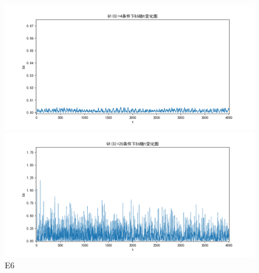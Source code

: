 \documentclass[10pt, a4paper]{article}
\begin{document}
    \begin{figure}[H]
        \begin{minipage}[t]{0.49\textwidth}
            \centering
            \includegraphics[width=\textwidth]{./q5_pics/cmp/E6.png}
        \end{minipage}
        \begin{minipage}[t]{0.49\textwidth}
            \centering
            \includegraphics[width=\textwidth]{./q5_pics/exp/E6.png}
        \end{minipage}
        \caption{E6}\label{fig:E6 in q5}
    \end{figure}
\end{document}
